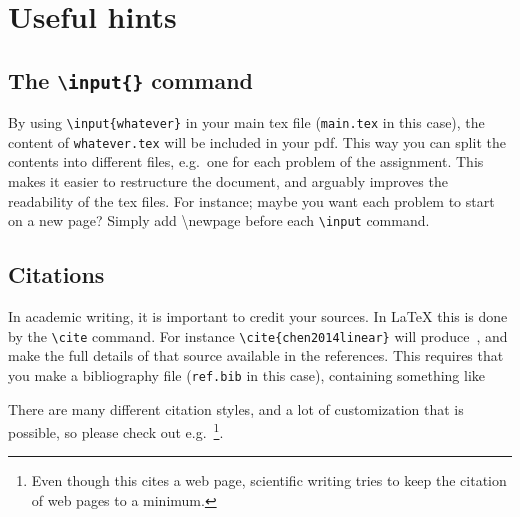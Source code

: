 \section{Useful hints}
\subsection{The \texttt{\textbackslash{input}\{\}} command}
By using \texttt{\textbackslash{input}\{whatever\}} in your main tex file (\texttt{main.tex} in this case), the content of \texttt{whatever.tex} will be included in your pdf. This way you can split the contents into different files, e.g.~one for each problem of the assignment. This makes it easier to restructure the document, and arguably improves the readability of the tex files. For instance; maybe you want each problem to start on a new page? Simply add \textbackslash{newpage} before each \texttt{\textbackslash{input}} command.

\subsection{Citations}
In academic writing, it is important to credit your sources. In \LaTeX{} this is done by the \texttt{\textbackslash{cite}} command. For instance \texttt{\textbackslash{cite}\{chen2014linear\}} will produce~\cite{chen2014linear}, and make the full details of that source available in the references. This requires that you make a bibliography file (\texttt{ref.bib} in this case), containing something like


There are many different citation styles, and a lot of customization that is possible, so please check out e.g.~\cite{wikibookLatex}\footnote{Even though this cites a web page, scientific writing tries to keep the citation of web pages to a minimum.}.
